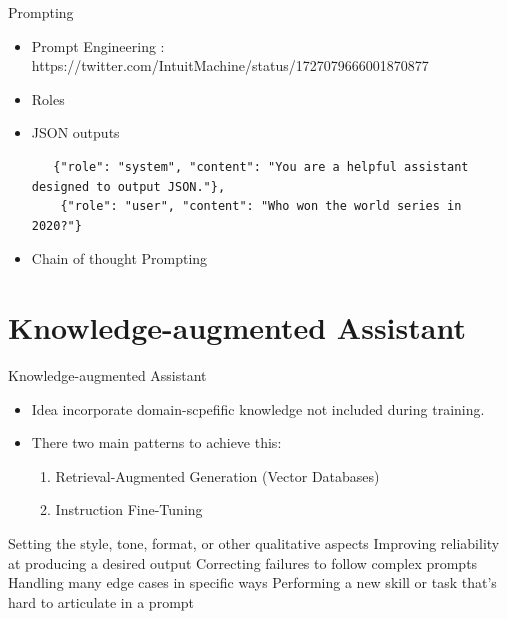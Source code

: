 \documentclass[handout]{beamer}
\begin{document}
\begin{frame}[fragile]{Prompting}
\begin{scriptsize}
\begin{itemize}
\item Prompt Engineering : https://twitter.com/IntuitMachine/status/1727079666001870877
\item Roles
\item JSON outputs
\begin{verbatim}
   {"role": "system", "content": "You are a helpful assistant designed to output JSON."},
    {"role": "user", "content": "Who won the world series in 2020?"}
\end{verbatim}


\item Chain of thought Prompting
\end{itemize}
\end{scriptsize}
\end{frame}


\section{Knowledge-augmented Assistant}

\begin{frame}{Knowledge-augmented Assistant}
\begin{scriptsize}
\begin{itemize}
\item Idea incorporate domain-scpefific knowledge not included during training.
\item There two main patterns to achieve this:
\begin{enumerate}\scriptsize
 \item Retrieval-Augmented Generation (Vector Databases)
 \item Instruction Fine-Tuning
\end{enumerate}
\end{itemize}

    Setting the style, tone, format, or other qualitative aspects
    Improving reliability at producing a desired output
    Correcting failures to follow complex prompts
    Handling many edge cases in specific ways
    Performing a new skill or task that’s hard to articulate in a prompt

\end{scriptsize}
\end{frame}
\end{document}
